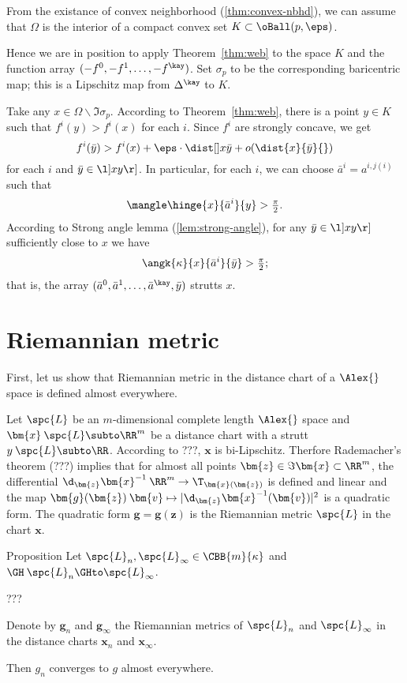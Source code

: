 From the existance of convex neighborhood (\ref{thm:convex-nbhd}),
we can assume that $\Omega$ is the interior of 
a compact convex set $K\subset \oBall(p,\eps)$.

Hence we are in position to apply Theorem~\ref{thm:web} to the space $K$ 
and the function array $(-f^0,-f^1,\dots,-f^\kay)$.
Set $\sigma_p$ to be the corresponding baricentric map;
this is a Lipschitz map from $\Delta^\kay$ to $K$. 

Take any $x\in\Omega\backslash\Im \sigma_p$.
According to Theorem~\ref{thm:web},
there is a point $y\in K$ such that $f^i(y)>f^i(x)$ for each $i$.
Since $f^i$ are strongly concave,
we get 
\[f^i(\bar y)>f^i(x)+\eps\cdot\dist[{{}}]x{\bar y}{}+o(\dist{x}{\bar y}{})\] 
for each $i$ and $\bar y\in \l]xy\r]$.
In particular, for each $i$, 
we can choose $\bar a^i=a^{i,j(i)}$  such that
\[\mangle\hinge{x}{\bar a^i}{y}>\tfrac\pi2.\]
According to Strong angle lemma (\ref{lem:strong-angle}),
for any $\bar y\in\l]xy\r]$ sufficiently close to $x$ we have
\[\angk{\kappa}{x}{\bar a^i}{\bar y}>\tfrac\pi2;\]
that is, the array $(\bar  a^0,\bar  a^1,\dots,\bar  a^\kay,\bar y)$ strutts $x$.
\qeds


\section{Riemannian metric}

First, let us show that Riemannian metric in the distance chart of a $\Alex{}$ space is defined almost everywhere.

Let $\spc{L}$ be an $m$-dimensional complete length $\Alex{}$ space
and $\bm{x}\:\spc{L}\subto\RR^m$ be a distance chart with a strutt $y\:\spc{L}\subto\RR$.
According to ???, $\bm{x}$ is bi-Lipschitz.
Therfore Rademacher's theorem (???) implies that
for almost all points $\bm{z}\in\Im\bm{x}\subset\RR^m$,
the differential 
$\d_{\bm{z}}\bm{x}^{-1}\:\RR^m
\to
\T_{\bm{x}(\bm{z})}$ 
is defined and linear 
and the map $\bm{g}(\bm{z})\:\bm{v}\mapsto|\d_{\bm{z}}\bm{x}^{-1}(\bm{v})|^2$
is a quadratic form.
The quadratic form $\bm{g}=\bm{g}(\bm{z})$ is the Riemannian metric $\spc{L}$ in the chart $\bm{x}$.

\begin{thm}{Proposition}
Let $\spc{L}_n,\spc{L}_\infty\in \CBB{m}{\kappa}$
and $\GH\:\spc{L}_n\GHto \spc{L}_\infty$.

???

Denote by $\bm{g}_n$ and $\bm{g}_\infty$ the Riemannian metrics of $\spc{L}_n$ and $\spc{L}_\infty$ in the distance charts $\bm{x}_n$ and $\bm{x}_\infty$.

Then $g_n$ converges to $g$ almost everywhere. 
\end{thm}


